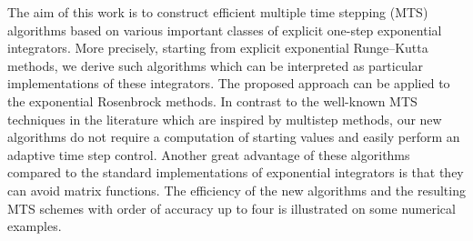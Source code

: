 The aim of this work is to construct efficient multiple time stepping (MTS) algorithms based on various important classes of explicit one-step exponential integrators. More precisely, starting from explicit exponential Runge--Kutta methods, we derive such algorithms which can be interpreted as particular implementations of these integrators. The proposed approach can be applied to the exponential Rosenbrock methods.  
 In contrast to the well-known MTS techniques in the literature which are inspired by multistep methods, our new algorithms do not require a computation of starting values and easily perform an adaptive time step control. Another great advantage of these algorithms compared to the standard implementations of exponential integrators is that they can avoid matrix functions. 
The efficiency of the new algorithms  and the resulting MTS schemes with order of accuracy up to four is illustrated on some numerical examples.
